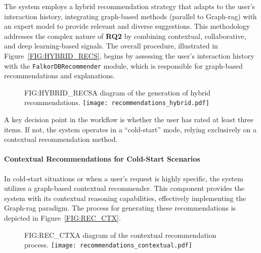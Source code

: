 The system employs a hybrid recommendation strategy that adapts to the user's interaction history, integrating graph-based methods (parallel to Graph-\ac{rag}) with an expert model to provide relevant and diverse suggestions. This methodology addresses the complex nature of \textbf{RQ2} by combining contextual, collaborative, and deep learning-based signals. The overall procedure, illustrated in Figure~\ref{FIG:HYBRID_RECS}, begins by assessing the user's interaction history with the \texttt{FalkorDBRecommender} module, which is responsible for graph-based recommendations and explanations.

\begin{figure}[Hybrid Recommendations Diagram]{FIG:HYBRID_RECS}{A diagram of the generation of hybrid recommendations.}
    \texttt{[image: recommendations\_hybrid.pdf]}
\end{figure}

A key decision point in the workflow is whether the user has rated at least three items. If not, the system operates in a ``cold-start'' mode, relying exclusively on a contextual recommendation method.

\paragraph{Contextual Recommendations for Cold-Start Scenarios}
In cold-start situations or when a user's request is highly specific, the system utilizes a graph-based contextual recommender. This component provides the system with its contextual reasoning capabilities, effectively implementing the Graph-\ac{rag} paradigm. The process for generating these recommendations is depicted in Figure~\ref{FIG:REC_CTX}.

\begin{figure}[Contextual Recommendations Diagram]{FIG:REC_CTX}{A diagram of the contextual recommendation process.}
    \texttt{[image: recommendations\_contextual.pdf]}
\end{figure}

